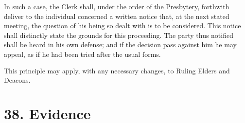 \documentclass[
]{book}
\begin{document}
\begin{enumerate}
  In such a case, the Clerk shall, under the order of the Presbytery, forthwith deliver to the individual concerned a written notice that, at the next stated meeting, the question of his being so dealt with is to be considered. This notice shall distinctly state the grounds for this proceeding. The party thus notified shall be heard in his own defense; and if the decision pass against him he may appeal, as if he had been tried after the usual forms.

  This principle may apply, with any necessary changes, to Ruling Elders and Deacons.
\end{enumerate}

\hypertarget{evidence}{%
\section*{38. Evidence}\label{evidence}}

\protect\hypertarget{chapter-slug-38-evidence}{\href{}{}}
\end{document}
